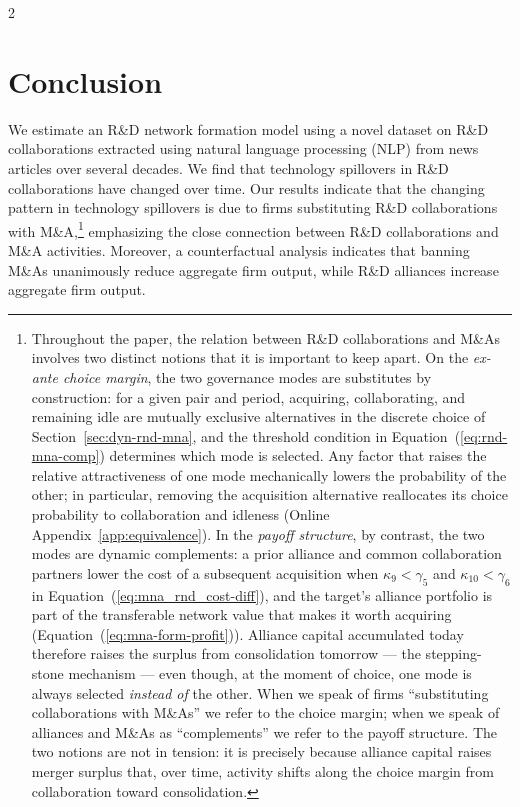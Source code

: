 \documentclass[12pt]{article}
\begin{document}
\begin{spacing}{2}
\section{Conclusion}
\label{sec:conclusion}
We estimate an R\&D network formation model using a novel dataset on R\&D collaborations extracted using natural language processing (NLP) from news articles over several decades. We find that technology spillovers in R\&D collaborations have changed over time. %
Our results indicate that the changing pattern in technology spillovers is due to firms substituting R\&D collaborations with M\&A,\footnote{Throughout the paper, the relation between R\&D collaborations and
M\&As involves two distinct notions that it is important to keep apart.
On the \emph{ex-ante choice margin}, the two governance modes are
substitutes by construction: for a given pair and period, acquiring,
collaborating, and remaining idle are mutually exclusive alternatives
in the discrete choice of Section~\ref{sec:dyn-rnd-mna}, and the
threshold condition in Equation~(\ref{eq:rnd-mna-comp}) determines
which mode is selected. Any factor that raises the relative
attractiveness of one mode mechanically lowers the probability of the
other; in particular, removing the acquisition alternative reallocates
its choice probability to collaboration and idleness
(Online Appendix~\ref{app:equivalence}). In the \emph{payoff structure},
by contrast, the two modes are dynamic complements: a prior alliance
and common collaboration partners lower the cost of a subsequent
acquisition when $\kappa_{9} < \gamma_{5}$ and
$\kappa_{10} < \gamma_{6}$ in
Equation~(\ref{eq:mna_rnd_cost-diff}), 
and the target's alliance portfolio is part of the transferable network
value that makes it worth acquiring
(Equation~(\ref{eq:mna-form-profit})). Alliance capital accumulated
today therefore raises the surplus from consolidation tomorrow --- the
stepping-stone mechanism --- even though, at the moment of choice, one
mode is always selected \emph{instead of} the other. When we speak of
firms ``substituting collaborations with M\&As'' we refer to the choice
margin; when we speak of alliances and M\&As as ``complements'' we
refer to the payoff structure. The two notions are not in tension: it
is precisely because alliance capital raises merger surplus that, over
time, activity shifts along the choice margin from collaboration
toward consolidation.} emphasizing the close connection between R\&D collaborations and M\&A activities. Moreover, a counterfactual analysis indicates that banning M\&As unanimously reduce aggregate firm output, while R\&D alliances increase aggregate firm output. %

\end{spacing}
\end{document}

